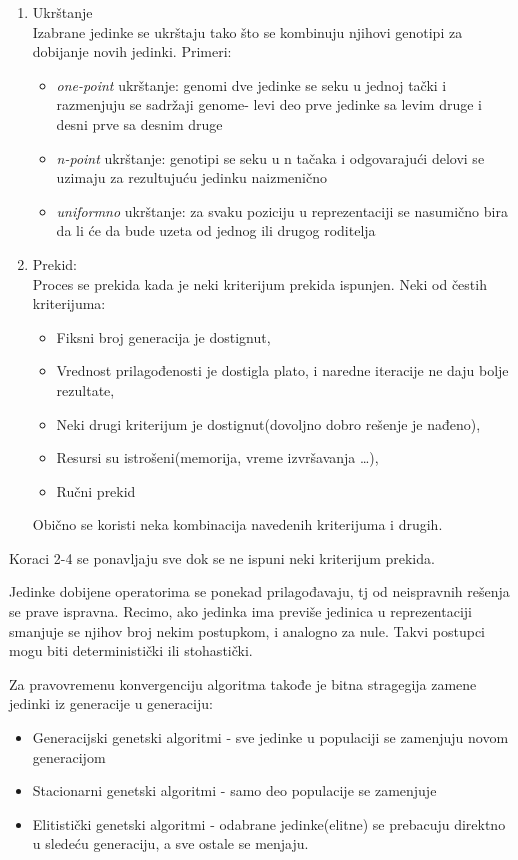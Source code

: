 \documentclass[a4paper]{article}
\begin{document}
\begin{enumerate}
\begin{itemize}
\end{itemize}
\item Ukrštanje \\ Izabrane jedinke se ukrštaju tako što se kombinuju njihovi genotipi za dobijanje novih jedinki. Primeri:
\begin{itemize}
\item \emph{one-point} ukrštanje: genomi dve jedinke se seku u jednoj tački i razmenjuju se sadržaji genome- levi deo prve jedinke sa levim druge i desni prve sa desnim druge
\item \emph{n-point} ukrštanje: genotipi se seku u n tačaka i odgovarajući delovi se uzimaju za rezultujuću jedinku naizmenično
\item \emph{uniformno} ukrštanje: za svaku poziciju u reprezentaciji se nasumično bira da li će da bude uzeta od jednog ili drugog roditelja
\end{itemize}
\item Prekid: \\ Proces se prekida kada je neki kriterijum prekida ispunjen. Neki od čestih kriterijuma:
\begin{itemize}
\item Fiksni broj generacija je dostignut,
\item Vrednost prilagođenosti je dostigla plato, i naredne iteracije ne daju bolje rezultate,
\item Neki drugi kriterijum je dostignut(dovoljno dobro rešenje je nađeno),
\item Resursi su istrošeni(memorija, vreme izvršavanja \ldots),
\item Ručni prekid
\end{itemize}
Obično se koristi neka kombinacija navedenih kriterijuma i drugih.
\end{enumerate}

 Koraci 2-4 se ponavljaju sve dok se ne ispuni neki kriterijum prekida.

Jedinke dobijene operatorima se ponekad prilagođavaju, tj od neispravnih rešenja se prave ispravna. Recimo, ako jedinka ima previše  jedinica u reprezentaciji smanjuje se njihov broj nekim postupkom, i analogno za nule. Takvi postupci mogu biti deterministički ili stohastički. 

Za pravovremenu konvergenciju algoritma takođe je bitna stragegija zamene jedinki iz generacije u generaciju\cite{gen2000}:
\begin{itemize}
\item Generacijski genetski algoritmi - sve jedinke u populaciji se zamenjuju novom generacijom
\item Stacionarni genetski algoritmi - samo deo populacije se zamenjuje
\item Elitistički genetski algoritmi - odabrane jedinke(elitne) se prebacuju direktno u sledeću generaciju, a sve ostale se menjaju.
\end{itemize}
\end{document}
